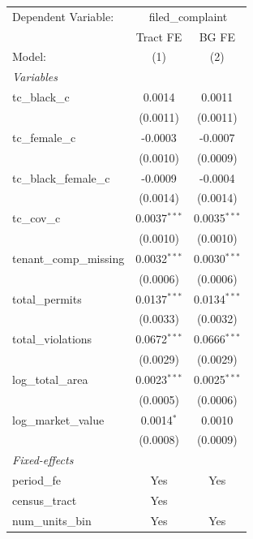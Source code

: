 \begingroup
\centering
\begin{tabular}{lcc}
   \tabularnewline \midrule \midrule
   Dependent Variable: & \multicolumn{2}{c}{filed\_complaint}\\
                           & Tract FE       & BG FE \\   
   Model:                  & (1)            & (2)\\  
   \midrule
   \emph{Variables}\\
   tc\_black\_c            & 0.0014         & 0.0011\\   
                           & (0.0011)       & (0.0011)\\   
   tc\_female\_c           & -0.0003        & -0.0007\\   
                           & (0.0010)       & (0.0009)\\   
   tc\_black\_female\_c    & -0.0009        & -0.0004\\   
                           & (0.0014)       & (0.0014)\\   
   tc\_cov\_c              & 0.0037$^{***}$ & 0.0035$^{***}$\\   
                           & (0.0010)       & (0.0010)\\   
   tenant\_comp\_missing   & 0.0032$^{***}$ & 0.0030$^{***}$\\   
                           & (0.0006)       & (0.0006)\\   
   total\_permits          & 0.0137$^{***}$ & 0.0134$^{***}$\\   
                           & (0.0033)       & (0.0032)\\   
   total\_violations       & 0.0672$^{***}$ & 0.0666$^{***}$\\   
                           & (0.0029)       & (0.0029)\\   
   log\_total\_area        & 0.0023$^{***}$ & 0.0025$^{***}$\\   
                           & (0.0005)       & (0.0006)\\   
   log\_market\_value      & 0.0014$^{*}$   & 0.0010\\   
                           & (0.0008)       & (0.0009)\\   
   \midrule
   \emph{Fixed-effects}\\
   period\_fe              & Yes            & Yes\\  
   census\_tract           & Yes            & \\  
   num\_units\_bin         & Yes            & Yes\\  

\end{tabular}
